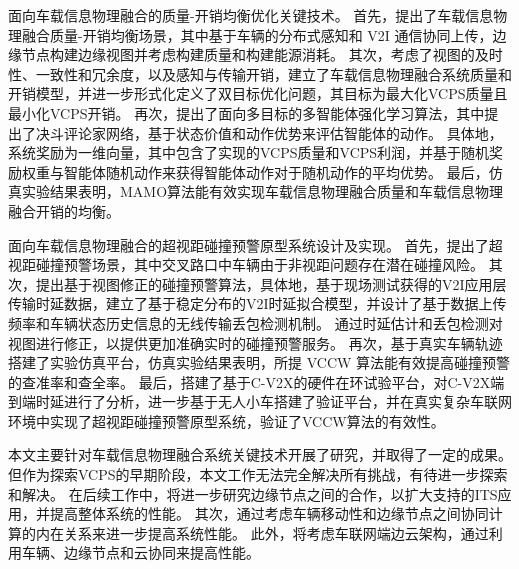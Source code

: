   面向车载信息物理融合的质量-开销均衡优化关键技术。
首先，提出了车载信息物理融合质量-开销均衡场景，其中基于车辆的分布式感知和 V2I 通信协同上传，边缘节点构建边缘视图并考虑构建质量和构建能源消耗。
其次，考虑了视图的及时性、一致性和冗余度，以及感知与传输开销，建立了车载信息物理融合系统质量和开销模型，并进一步形式化定义了双目标优化问题，其目标为最大化VCPS质量且最小化VCPS开销。
再次，提出了面向多目标的多智能体强化学习算法，其中提出了决斗评论家网络，基于状态价值和动作优势来评估智能体的动作。
具体地，系统奖励为一维向量，其中包含了实现的VCPS质量和VCPS利润，并基于随机奖励权重与智能体随机动作来获得智能体动作对于随机动作的平均优势。
最后，仿真实验结果表明，MAMO算法能有效实现车载信息物理融合质量和车载信息物理融合开销的均衡。

 面向车载信息物理融合的超视距碰撞预警原型系统设计及实现。
首先，提出了超视距碰撞预警场景，其中交叉路口中车辆由于非视距问题存在潜在碰撞风险。
其次，提出基于视图修正的碰撞预警算法，具体地，基于现场测试获得的V2I应用层传输时延数据，建立了基于稳定分布的V2I时延拟合模型，并设计了基于数据上传频率和车辆状态历史信息的无线传输丢包检测机制。
通过时延估计和丢包检测对视图进行修正，以提供更加准确实时的碰撞预警服务。
再次，基于真实车辆轨迹搭建了实验仿真平台，仿真实验结果表明，所提 VCCW 算法能有效提高碰撞预警的查准率和查全率。
最后，搭建了基于C-V2X的硬件在环试验平台，对C-V2X端到端时延进行了分析，进一步基于无人小车搭建了验证平台，并在真实复杂车联网环境中实现了超视距碰撞预警原型系统，验证了VCCW算法的有效性。

本文主要针对车载信息物理融合系统关键技术开展了研究，并取得了一定的成果。
但作为探索VCPS的早期阶段，本文工作无法完全解决所有挑战，有待进一步探索和解决。
在后续工作中，将进一步研究边缘节点之间的合作，以扩大支持的ITS应用，并提高整体系统的性能。
其次，通过考虑车辆移动性和边缘节点之间协同计算的内在关系来进一步提高系统性能。
此外，将考虑车联网端边云架构，通过利用车辆、边缘节点和云协同来提高性能。
